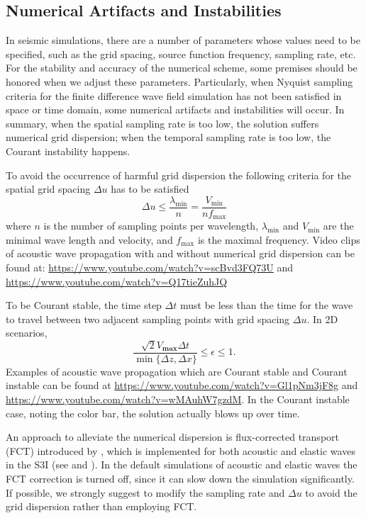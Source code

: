 \documentclass[11pt,titlepage]{article}
\theoremstyle{plain}
\theoremstyle{definition}
\theoremstyle{remark}
\numberwithin{equation}{section}
\begin{document}
\subsection{Numerical Artifacts and Instabilities}
In seismic simulations, there are a number of parameters whose values need to be specified, such as the grid spacing, source function frequency, sampling rate, etc. For the stability and accuracy of the numerical scheme, some premises should be honored when we adjust these parameters.  
Particularly, when Nyquist sampling criteria for the finite difference wave field simulation has not been satisfied in space or time domain, some numerical artifacts and instabilities will occur. In summary, when the spatial sampling rate is too low,  the solution suffers numerical grid dispersion; when the temporal sampling rate is too low, the Courant instability happens.

To avoid the occurrence of harmful grid dispersion the following criteria for the spatial grid spacing $\Delta u$ has to be satisfied
\begin{equation}
  \Delta u \leq \frac{\lambda_{\min}}{n} = \frac{V_{\min}}{nf_{\max}}
\end{equation}
where $n$ is the number of sampling points per wavelength, $\lambda_{\min}$ and $V_{\min}$ are the minimal wave length and velocity, and $f_{\max}$ is the maximal frequency. Video clips of acoustic wave propagation with and without numerical grid dispersion can be found at:
\url{https://www.youtube.com/watch?v=scBvd3FQ73U} and \url{https://www.youtube.com/watch?v=Q17tieZuhJQ}

To be Courant stable, the time step $\Delta t$ must be less than the time for the wave to travel between two 
adjacent sampling points with grid spacing $\Delta u$. In 2D scenarios,
\begin{equation}
\frac{\sqrt{2}V_{\textbf{max}}\Delta t}{\min\{\Delta z, \Delta x\}}\le \epsilon \le 1.
\end{equation}
Examples of acoustic wave propagation which are Courant stable and Courant instable can be found at
\url{https://www.youtube.com/watch?v=Gl1pNm3jF8g}  and \url{https://www.youtube.com/watch?v=wMAuhW7gzdM}. 
In the Courant instable case, noting the color bar, the solution actually blows up over time.

An approach to alleviate the numerical dispersion is flux-corrected transport (FCT) introduced by \cite{Fei:1995aa}, 
which is implemented for both acoustic and elastic waves in the S3I (see  and ).
In the default simulations of acoustic and elastic waves the FCT correction is turned off, since it can slow down the simulation significantly. If possible, we strongly suggest to modify the sampling rate and $\Delta u$ 
to avoid the grid dispersion rather than employing FCT.  
\end{document}
